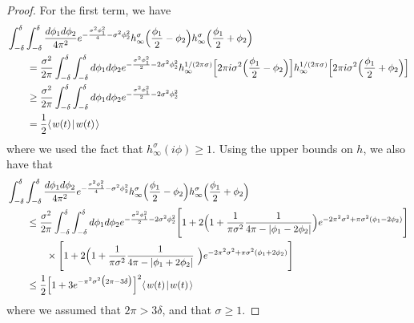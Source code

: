 \documentclass[../thesis-main/thesis-main]{subfiles}
\begin{document}
\begin{proof}
For the first term, we have
\begin{align}
  &\int_{-\delta}^\delta \int_{-\delta}^{\delta} \frac{ d\phi_1 d\phi_2}{4\pi^2} e^{ - \frac{\sigma^2\phi_1^2}{4} - \sigma^2 \phi_2^2} h_\infty^\sigma \Big(\frac{\phi_1}{2} - \phi_2\Big) h_\infty^\sigma \Big( \frac{\phi_1}{2} + \phi_2\Big)\nonumber\\
  & \qquad =  \frac{\sigma^2}{2\pi} \int_{-\delta}^\delta \int_{-\delta}^\delta d\phi_1 d\phi_2 e^{ -\frac{\sigma^2 \phi_1^2}{2} - 2\sigma^2 \phi_2^2} h_\infty^{1/(2\pi \sigma)} \Big[2 \pi i \sigma^2 \Big(\frac{\phi_1}{2} - \phi_2 \Big)\Big]h_\infty^{1/(2\pi \sigma)} \Big[2 \pi i \sigma^2 \Big(\frac{\phi_1}{2} +\phi_2 \Big)\Big]\\
 & \qquad \geq \frac{\sigma^2}{2\pi} \int_{-\delta}^\delta \int_{-\delta}^\delta d\phi_1 d\phi_2 e^{ -\frac{\sigma^2 \phi_1^2}{2} - 2\sigma^2 \phi_2^2}\\
 & \qquad = \frac{1}{2} \langle\mspace{2mu} w(t) \mspace{2mu} | \mspace{2mu} w(t)\mspace{2mu} \rangle
\end{align}
where we used the fact that $h_\infty^\sigma(i \phi) \geq 1$.  Using the upper bounds on $h$, we also have that
\begin{align}
&\int_{-\delta}^\delta \int_{-\delta}^{\delta} \frac{ d\phi_1 d\phi_2}{4\pi^2} e^{ - \frac{\sigma^2\phi_1^2}{4} - \sigma^2 \phi_2^2} h_\infty^\sigma \Big(\frac{\phi_1}{2} - \phi_2\Big) h_\infty^\sigma \Big( \frac{\phi_1}{2} + \phi_2\Big)\nonumber\\
& \qquad \leq \frac{\sigma^2}{2\pi} \int_{-\delta}^\delta \int_{-\delta}^\delta d\phi_1 d\phi_2 e^{ -\frac{\sigma^2 \phi_1^2}{2} - 2\sigma^2 \phi_2^2} \Bigg[1 + 2 \Big(1 + \frac{ 1}{\pi \sigma^2} \frac{1}{4 \pi -  | \phi_1 - 2\phi_2|} \Big)e^{-2\pi^2 \sigma^2 + \pi \sigma^2 (\phi_1 - 2 \phi_2)} \Bigg]\nonumber\\
& \qquad \qquad \times   \Bigg[1 + 2 \Big(1 + \frac{ 1}{\pi \sigma^2} \frac{1}{4 \pi -  | \phi_1+ 2\phi_2|} \ \Big)e^{-2\pi^2 \sigma^2 +   \pi \sigma^2 (\phi_1 + 2 \phi_2)} \Bigg]\\
& \qquad \leq \frac{1}{2} \Big[1 + 3 e^{ -  \pi^2 \sigma^2 \big(2 \pi - 3\delta\big)} \Big]^2  \langle\mspace{2mu} w(t) \mspace{2mu} | \mspace{2mu} w(t)\mspace{2mu} \rangle
\end{align}
where we assumed that $2\pi > 3 \delta$, and that $\sigma \geq 1$. 


\end{proof}
\end{document}
